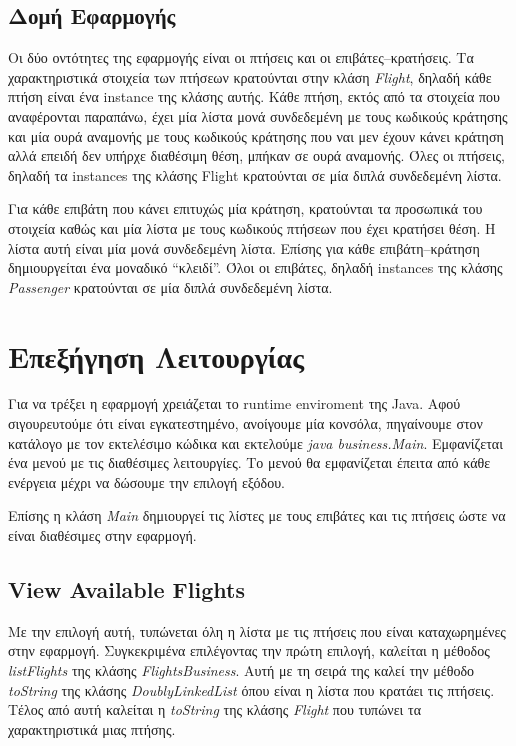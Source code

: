 \documentclass[a4paper]{article}
\begin{document}
\subsection{Δομή Εφαρμογής}
Οι δύο οντότητες της εφαρμογής είναι οι πτήσεις και οι επιβάτες--κρατήσεις. Τα
χαρακτηριστικά στοιχεία των πτήσεων κρατούνται στην κλάση \emph{Flight}, δηλαδή
κάθε πτήση είναι ένα instance της κλάσης αυτής. Κάθε πτήση, εκτός από τα
στοιχεία που αναφέρονται παραπάνω, έχει μία λίστα μονά συνδεδεμένη με τους
κωδικούς κράτησης και μία ουρά αναμονής με τους κωδικούς κράτησης που ναι μεν
έχουν κάνει κράτηση αλλά επειδή δεν υπήρχε διαθέσιμη θέση, μπήκαν σε ουρά
αναμονής. Όλες οι πτήσεις, δηλαδή τα instances της κλάσης Flight κρατούνται σε
μία διπλά συνδεδεμένη λίστα.

Για κάθε επιβάτη που κάνει επιτυχώς μία κράτηση, κρατούνται τα προσωπικά του
στοιχεία καθώς και μία λίστα με τους κωδικούς πτήσεων που έχει κρατήσει θέση. Η
λίστα αυτή είναι μία μονά συνδεδεμένη λίστα. Επίσης για κάθε επιβάτη--κράτηση
δημιουργείται ένα μοναδικό ``κλειδί''. Όλοι οι επιβάτες, δηλαδή instances της
κλάσης \emph{Passenger} κρατούνται σε μία διπλά συνδεδεμένη λίστα.

\section{Επεξήγηση Λειτουργίας}
Για να τρέξει η εφαρμογή χρειάζεται το runtime enviroment της Java. Αφού
σιγουρευτούμε ότι είναι εγκατεστημένο, ανοίγουμε μία κονσόλα, πηγαίνουμε στον
κατάλογο με τον εκτελέσιμο κώδικα και εκτελούμε \emph{java business.Main}.
Εμφανίζεται ένα μενού με τις διαθέσιμες λειτουργίες. Το μενού θα εμφανίζεται
έπειτα από κάθε ενέργεια μέχρι να δώσουμε την επιλογή εξόδου.

Επίσης η κλάση \emph{Main} δημιουργεί τις λίστες με τους επιβάτες και τις
πτήσεις ώστε να είναι διαθέσιμες στην εφαρμογή.

\subsection{View Available Flights}
Με την επιλογή αυτή, τυπώνεται όλη η λίστα με τις πτήσεις που είναι
καταχωρημένες στην εφαρμογή. Συγκεκριμένα επιλέγοντας την πρώτη επιλογή,
καλείται η μέθοδος \emph{listFlights} της κλάσης \emph{FlightsBusiness}. Αυτή με
τη σειρά της καλεί την μέθοδο \emph{toString} της κλάσης \emph{DoublyLinkedList}
όπου είναι η λίστα που κρατάει τις πτήσεις. Τέλος από αυτή καλείται η
\emph{toString} της κλάσης \emph{Flight} που τυπώνει τα χαρακτηριστικά μιας
πτήσης.
\end{document}
